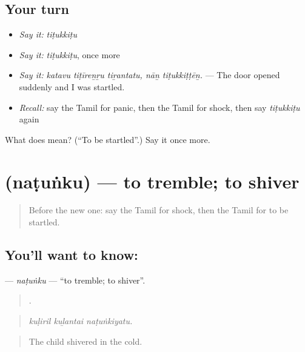 \subsection*{Your turn}
\begin{itemize}
\raggedright
  \item \emph{Say it:} \emph{tiṭukkiṭu}
  \item \emph{Say it:} \emph{tiṭukkiṭu}, once more
  \item \emph{Say it:} \emph{katavu tiṭīreṉṟu tiṟantatu, nāṉ tiṭukkiṭṭēṉ.} — The door opened suddenly and I was startled.
  \item \emph{Recall:} say the Tamil for panic, then the Tamil for shock, then say \emph{tiṭukkiṭu} again
\end{itemize}

\begin{tcolorbox}[breakable,colback=teal!4,colframe=teal!35!black,title={Before you move on}]
What does  mean? (\textquotedblleft{}To be startled\textquotedblright{}.) Say it once more.
\end{tcolorbox}
\section[\texorpdfstring{\ta{நடுங்கு} (naṭuṅku)}{நடுங்கு (naṭuṅku)}]{ (naṭuṅku) — to tremble; to shiver}

\label{lesson:TA-C454-natunku}



\begin{quote}
Before the new one: say the Tamil for shock, then the Tamil for to be startled.
\end{quote}

\subsection*{You'll want to know: }
\textbf{} — \emph{naṭuṅku} — \textquotedblleft{}to tremble; to shiver\textquotedblright{}.

\begin{quote}
  .
\end{quote}

\begin{quote}
\emph{kuḷiril kuḻantai naṭuṅkiyatu.}
\end{quote}

\begin{quote}
The child shivered in the cold.
\end{quote}

